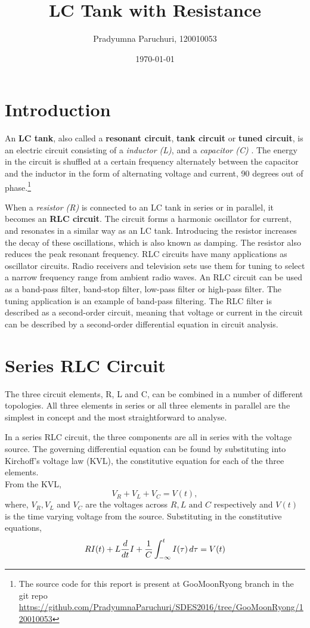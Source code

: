 \documentclass[12pt, twosides]{article}
\title{LC Tank with Resistance}
\date{\today}
\author{Pradyumna Paruchuri, 120010053}
\newcommand{\voltage}{\ensuremath{V}}
\newcommand{\curr}{I}
\newcommand{\res}{R}
\newcommand{\capc}{C}
\newcommand{\ind}{L}
\newcommand{\der}[1]{
\ifnum#1=1
	\frac{d}{dt}
\else
	\frac{d^#1}{dt^#1}
\fi
}
\begin{document}
	\maketitle
	
	\section{Introduction}
		An \textbf{LC tank}, also called a \textbf{resonant circuit}, \textbf{tank circuit} or \textbf{tuned circuit}, is an electric circuit consisting of a \textit{inductor (L)}, and a \textit{capacitor (C)} \cite{Wikipedia}. The energy in the circuit is shuffled at a certain frequency alternately between the capacitor and the inductor in the form of alternating voltage and current, 90 degrees out of phase.\footnote{\label{source} The source code for this report is present at GooMoonRyong branch in the git repo \url{https://github.com/PradyumnaParuchuri/SDES2016/tree/GooMoonRyong/120010053} }

		When a \textit{resistor (R)} is connected to an LC tank in series or in parallel, it becomes an \textbf{RLC circuit}. The circuit forms a harmonic oscillator for current, and resonates in a similar way as an LC tank. Introducing the resistor increases the decay of these oscillations, which is also known as damping. The resistor also reduces the peak resonant frequency.
		RLC circuits have many applications as oscillator circuits. Radio receivers and television sets use them for tuning to select a narrow frequency range from ambient radio waves. An RLC circuit can be used as a band-pass filter, band-stop filter, low-pass filter or high-pass filter. The tuning application is an example of band-pass filtering. The RLC filter is described as a second-order circuit, meaning that voltage or current in the circuit can be described by a second-order differential equation in circuit analysis.

	\section{Series RLC Circuit}

		The three circuit elements, R, L and C, can be combined in a number of different topologies. All three elements in series or all three elements in parallel are the simplest in concept and the most straightforward to analyse.

		In a series RLC circuit, the three components are all in series with the voltage source. The governing differential equation can be found by substituting into Kirchoff's voltage law (KVL), the constitutive equation for each of the three elements.\\
		From the KVL,
		\[ \voltage_{R} + \voltage_{L} + \voltage_{C} = \voltage(t),\]
		where, \(\voltage_R, \voltage_L\) and \(\voltage_C\) are the voltages across \(\res, \ind \text{ and } \capc\) respectively and \(\voltage(t)\) is the time varying voltage from the source. Substituting in the constitutive equations,
		\begin{equation}
		\label{e:series RLC cur}
			\res \curr(t) + \ind \der{1} \curr + \frac{1}{\capc} \int_{-\infty}^{t} I(\tau)\, d\tau = \voltage(t)
		\end{equation}
		
\end{document}

